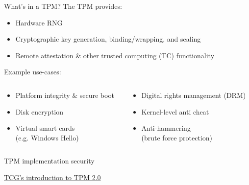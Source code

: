 \begin{frame}{What's in a TPM?}
  The TPM provides:
  \begin{itemize}[<+(1)->]
    \item Hardware RNG
    \item Cryptographic key generation, binding/wrapping, and sealing
    \item Remote attestation \& other trusted computing (TC) functionality
  \end{itemize}

  \pause
  Example use-cases:
  \begin{columns}[T,onlytextwidth]
    \begin{column}{0.5\textwidth}
      \begin{itemize}[<+(1)->]
        \item Platform integrity \& secure boot
        \item Disk encryption
        \item Virtual smart cards\\(e.g. Windows Hello)
      \end{itemize}
    \end{column}
    \begin{column}{0.5\textwidth}
      \begin{itemize}[<+(1)->]
        \item Digital rights management (DRM)
        \item Kernel-level anti cheat
        \item Anti-hammering\\(brute force protection)
      \end{itemize}
    \end{column}
  \end{columns}
\end{frame}

\begin{frame}{TPM implementation security}
  \begin{center}
    \href{https://trustedcomputinggroup.org/wp-content/uploads/TPM-2.0-A-Brief-Introduction.pdf}{TCG's introduction to TPM 2.0}
  \end{center}
\end{frame}


